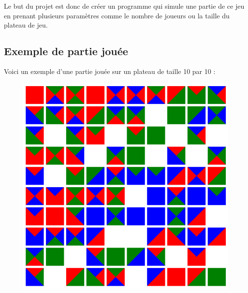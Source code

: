 \documentclass[11pt]{article}
\begin{document}
\begin{figure}[H]
\begin{minipage}[b]{0.40\linewidth}
    \end{minipage} \hfill
\end{figure}

Le but du projet est donc de créer un programme qui simule une partie de ce jeu en prenant plusieurs paramètres comme le nombre de joueurs ou la taille du plateau de jeu. 

\newpage

\subsection{Exemple de partie jouée}

Voici un exemple d'une partie jouée sur un plateau de taille 10 par 10 : 

\begin{figure}[H]
\centering
\includegraphics[scale=0.4]{Exemple -n 10.PNG}
\label{fig: exemplepartie}
\end{figure}
\end{document}
